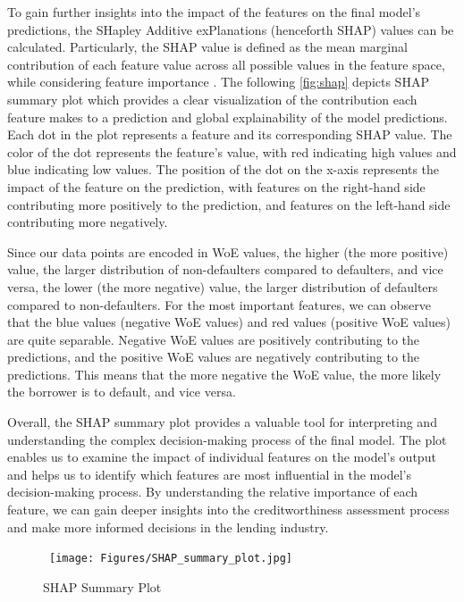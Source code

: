To gain further insights into the impact of the features on the final model's predictions, the SHapley Additive exPlanations (henceforth SHAP) values can be calculated. Particularly, the SHAP value is defined as the mean marginal contribution of each feature value across all possible values in the feature space, while considering feature importance \citep{bhattacharya2022applied}.
The following \autoref{fig:shap} depicts SHAP summary plot which provides a clear visualization of the contribution each feature makes to a prediction and global explainability of the model predictions.
Each dot in the plot represents a feature and its corresponding SHAP value.
The color of the dot represents the feature's value, with red indicating high values and blue indicating low values.
The position of the dot on the x-axis represents the impact of the feature on the prediction, with features on the right-hand side contributing more positively to the prediction, and features on the left-hand side contributing more negatively.

Since our data points are encoded in WoE values, the higher (the more positive) value, the larger distribution of non-defaulters compared to defaulters, and vice versa, the lower (the more negative) value, the larger distribution of defaulters compared to non-defaulters.
For the most important features, we can observe that the blue values (negative WoE values) and red values (positive WoE values) are quite separable.
Negative WoE values are positively contributing to the predictions, and the positive WoE values are negatively contributing to the predictions. This means that the more negative the WoE value, the more likely the borrower is to default, and vice versa.

Overall, the SHAP summary plot provides a valuable tool for interpreting and understanding the complex decision-making process of the final model.
The plot enables us to examine the impact of individual features on the model's output and helps us to identify which features are most influential in the model's decision-making process.
By understanding the relative importance of each feature, we can gain deeper insights into the creditworthiness assessment process and make more informed decisions in the lending industry.

\begin{figure}[H]
\centering
\caption{SHAP Summary Plot}\vspace{0.5em}
\label{fig:shap}\
\texttt{[image: Figures/SHAP\_summary\_plot.jpg]}

\vspace{-1em}
\end{figure}


